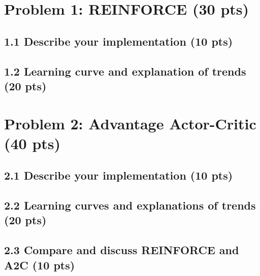 \documentclass[12pt]{article}
\begin{document}
\newpage
\section*{Problem 1: REINFORCE (30 pts)}

\subsection*{1.1 Describe your implementation (10 pts)}
\begin{solution}[height=20cm]
\end{solution}

\subsection*{1.2 Learning curve and explanation of trends (20 pts)}
\begin{solution}[height=20cm]
\end{solution}

\newpage
\section*{Problem 2: Advantage Actor-Critic (40 pts)}

\subsection*{2.1 Describe your implementation (10 pts)}
\begin{solution}[height=20cm]
\end{solution}

\subsection*{2.2 Learning curves and explanations of trends (20 pts)}
\begin{solution}[height=20cm]
\end{solution}

\subsection*{2.3 Compare and discuss REINFORCE and A2C (10 pts)}
\begin{solution}[height=20cm]
\end{solution}
\end{document}
